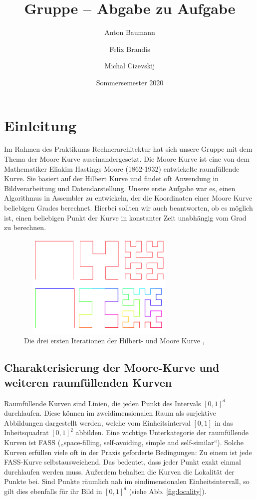 \documentclass[course=erap]{aspdoc}
\author{Anton Baumann \and Felix Brandis \and Michal Cizevskij}
\date{Sommersemester 2020}
\title{Gruppe \theGroup{} -- Abgabe zu Aufgabe \theNumber}
\begin{document}
\maketitle

\section{Einleitung}
Im Rahmen des Praktikums Rechnerarchitektur hat sich unsere Gruppe mit dem Thema der Moore Kurve auseinandergesetzt. Die Moore Kurve ist eine von dem Mathematiker Eliakim Hastings Moore (1862-1932) entwickelte raumfüllende Kurve. Sie basiert auf der Hilbert Kurve und findet oft Anwendung in Bildverarbeitung und Datendarstellung. Unsere erste Aufgabe war es, einen Algorithmus in Assembler zu entwickeln, der die Koordinaten einer Moore Kurve beliebigen Grades berechnet. Hierbei sollten wir auch beantworten, ob es möglich ist, einen beliebigen Punkt der Kurve in konstanter Zeit unabhängig vom Grad zu berechnen.

\begin{figure}[h]
\centering
    \includegraphics[width=8cm, height=5cm]{Moore_and_Hilbert}
    \caption{Die drei ersten Iterationen der Hilbert- und Moore Kurve \cite{pic:hilbert}, \cite{pic:Moore}}
    \label{fig:mooreCurve}
\end{figure}

\subsection{Charakterisierung der Moore-Kurve und weiteren raumfüllenden Kurven}
Raumfüllende Kurven sind Linien, die jeden Punkt des Intervals $[0,1]^d$ durchlaufen. Diese können im zweidimensionalen Raum als surjektive Abbildungen dargestellt werden, welche vom Einheitsinterval $[0,1]$ in das Inheitsquadrat $[0,1]^2$ abbilden. 
\newline
Eine wichtige Unterkategorie der raumfüllende Kurven ist FASS („space-filling, self-avoiding, simple and self-similar“). Solche Kurven erfüllen viele oft in der Praxis geforderte Bedingungen: Zu einem ist jede FASS-Kurve selbstausweichend. Das bedeutet, dass jeder Punkt exakt einmal durchlaufen werden muss. Außerdem behalten die Kurven die Lokalität der Punkte bei. Sind Punkte räumlich nah im eindimensionalen Einheitsintervall, so gilt dies ebenfalls für ihr Bild in $[0,1]^d$ (siehe Abb. \ref{fig:locality}). 
\end{document}
